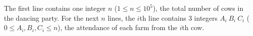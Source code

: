 The first line contains one integer $n$ ($1 \le n \le 10^5$), the total number of cows in the dancing party.
For the next $n$ lines, the $i$th line contains 3 integers $A_i\ B_i\ C_i$ ($0 \le A_i, B_i, C_i \le n$),
the attendance of each farm from the $i$th cow.
